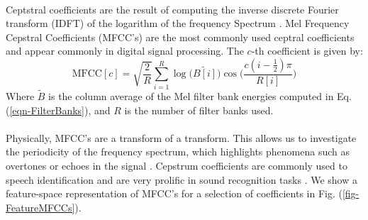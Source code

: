 \documentclass[12pt,letterpaper]{article}
\begin{document}
\paragraph*{}Ceptstral coefficients are the result of computing the inverse discrete Fourier transform (IDFT) of the logarithm of the frequency Spectrum \cite{Serizel,Sahidullah}. Mel Frequency Cepstral Coefficients (MFCC's) are the most commonly used ceptral coefficients and appear commonly in digital signal processing. The $c$-th coefficient is given by:
\begin{equation}
\label{feat-MFCC}
\text{MFCC}[c] = \sqrt{\frac{2}{R}} \sum_{i=1}^{R} 
\log\big(\widetilde{B[i]}\big) \cos\bigg(\frac{c(i-\frac{1}{2})\pi}{R[i]}\bigg)
\end{equation}
Where $\widetilde{B}$ is the column average of the Mel filter bank energies computed in Eq. (\ref{eqn-FilterBanks}), and $R$ is the number of filter banks used.

\paragraph*{}Physically, MFCC's are a transform of a transform. This allows us to investigate the periodicity of the frequency spectrum, which highlights phenomena such as overtones or echoes in the signal \cite{Virtanen}. Cepstrum coefficients are commonly used to speech identification and are very prolific in sound recognition tasks \cite{Serizel,Sahidullah,Liu}. We show a feature-space representation of MFCC's for a selection of coefficients in Fig. (\ref{fig-FeatureMFCCs}).
\end{document}
